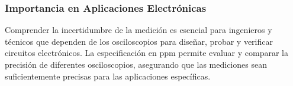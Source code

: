 \subsubsection{Importancia en Aplicaciones Electrónicas}

Comprender la incertidumbre de la medición es esencial para ingenieros y técnicos que dependen de los osciloscopios para diseñar, probar y verificar circuitos electrónicos. La especificación en ppm permite evaluar y comparar la precisión de diferentes osciloscopios, asegurando que las mediciones sean suficientemente precisas para las aplicaciones específicas.

\newpage
